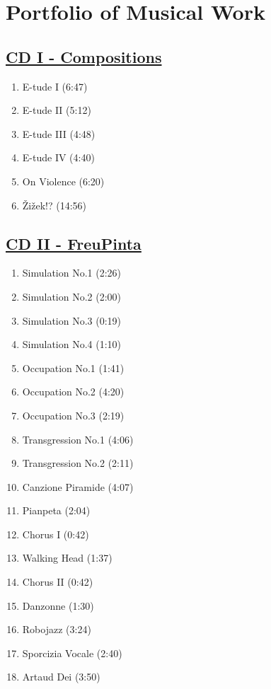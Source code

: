 \chapter*{Portfolio of Musical Work}
\hypertarget{portfolio}{}

\section*{\href{http://phd.federicoreuben.com/contents/audio/compositions/}{CD I - Compositions}}

\begin{enumerate}
\item E-tude I (6:47)
\item E-tude II (5:12)
\item E-tude III (4:48)
\item E-tude IV (4:40)
\item On Violence (6:20)
\item \v{Z}i\v{z}ek!? (14:56)
\end{enumerate}

\section*{\href{http://phd.federicoreuben.com/contents/audio/freupinta/}{CD II - FreuPinta}}

\begin{enumerate}
\item Simulation No.1 (2:26)
\item Simulation No.2 (2:00)
\item Simulation No.3 (0:19)
\item Simulation No.4 (1:10)
\item Occupation No.1 (1:41)
\item Occupation No.2 (4:20)
\item Occupation No.3 (2:19)
\item Transgression No.1 (4:06)
\item Transgression No.2 (2:11)
\item Canzione Piramide (4:07)
\item Pianpeta (2:04)
\item Chorus I (0:42)
\item Walking Head (1:37)
\item Chorus II (0:42)
\item Danzonne (1:30)
\item Robojazz (3:24)
\item Sporcizia Vocale (2:40)
\item Artaud Dei (3:50)
\end{enumerate}

